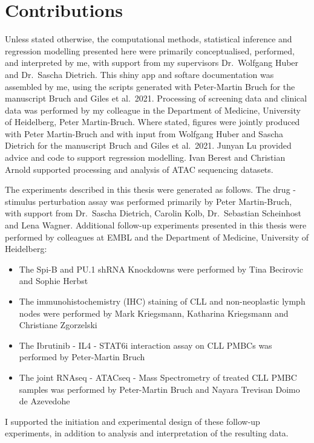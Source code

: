 \documentclass[11pt, a4paper, twosided]{book}
\begin{document}
    \hypertarget{contributions}{%
    \chapter*{Contributions}\label{contributions}}

    Unless stated otherwise, the computational methods, statistical inference and regression modelling presented here were primarily conceptualised, performed, and interpreted by me, with support from my supervisors Dr.~Wolfgang Huber and Dr.~Sascha Dietrich. This shiny app and softare documentation was assembled by me, using the scripts generated with Peter-Martin Bruch for the manuscript Bruch and Giles et al.~2021. Processing of screening data and clinical data was performed by my colleague in the Department of Medicine, University of Heidelberg, Peter Martin-Bruch. Where stated, figures were jointly produced with Peter Martin-Bruch and with input from Wolfgang Huber and Sascha Dietrich for the manuscript Bruch and Giles et al.~2021. Junyan Lu provided advice and code to support regression modelling. Ivan Berest and Christian Arnold supported processing and analysis of ATAC sequencing datasets.

    The experiments described in this thesis were generated as follows. The drug - stimulus perturbation assay was performed primarily by Peter Martin-Bruch, with support from Dr.~Sascha Dietrich, Carolin Kolb, Dr.~Sebastian Scheinhost and Lena Wagner. Additional follow-up experiments presented in this thesis were performed by colleagues at EMBL and the Department of Medicine, University of Heidelberg:
    \begin{itemize}
        \item  The Spi-B and PU.1 shRNA Knockdowns were performed by Tina Becirovic and Sophie Herbst
        \item  The immunohistochemistry (IHC) staining of CLL and non-neoplastic lymph nodes were performed by Mark Kriegsmann, Katharina Kriegsmann and Christiane Zgorzelski
        \item  The Ibrutinib - IL4 - STAT6i interaction assay on CLL PMBCs was performed by Peter-Martin Bruch
        \item  The joint RNAseq - ATACseq - Mass Spectrometry of treated CLL PMBC samples was performed by Peter-Martin Bruch and Nayara Trevisan Doimo de Azevedohe
        
    \end{itemize}
    I supported the initiation and experimental design of these follow-up experiments, in addition to analysis and interpretation of the resulting data.
\newpage\null\newpage
\end{document}
